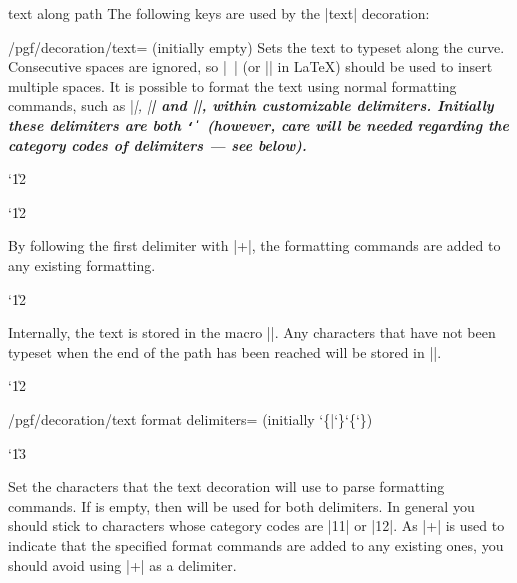\begin{decoration}{text along path}
  The following keys are used by the |text| decoration:
  \begin{key}{/pgf/decoration/text=
      (initially \normalfont empty)}
    Sets the text to typeset along the curve.
    Consecutive spaces are ignored, so |\ | (or |\space| in \LaTeX)
    should be used to insert multiple spaces.	It is possible to
    format the text using normal formatting commands, such as |\it|, |\bf|
    and |\color|, within customizable delimiters. Initially these
    delimiters are both {\tt\char`\|} (however, care will be needed
    regarding	the category codes of delimiters --- see below).

{\catcode`\|12
\begin{codeexample}[]
\catcode`\|12
\end{codeexample}
}
    By following the first delimiter
    with |+|, the formatting commands are added to any existing
    formatting.

{\catcode`\|12
\begin{codeexample}[]
\end{codeexample}
}
	
    Internally, the text is stored in the macro |\pgfdecorationtext|.
    Any characters that have not been typeset when the end of the
    path has been reached will be stored in |\pgfdecorationrestoftext|.

  \end{key}

{\catcode`\|12
  \begin{key}{/pgf/decoration/text format delimiters= (initially \char`\{|\char`\}\char`\{\char`\})}

    \catcode`\|13
	
    Set the characters that the text decoration will use to parse
    formatting commands.
    If  is empty, then  will be used for both
    delimiters.
    In general you should stick to characters	whose category codes are
    |11| or |12|.
    As |+| is used to indicate that the specified format commands
    are added	to any existing ones, you should avoid using |+| as
    a delimiter.


\end{key}}
\end{decoration}
